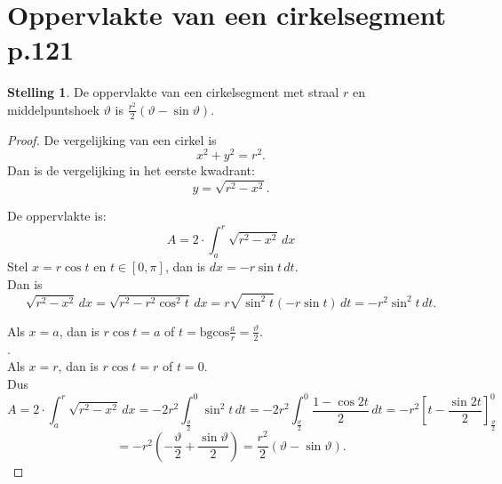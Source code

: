 \documentclass{article}
\theoremstyle{definition}
\newtheorem*{Stelling}{Stelling}
\begin{document}
\section{Oppervlakte van een cirkelsegment p.121}
\begin{Stelling}
De oppervlakte van een cirkelsegment met straal $r$ en middelpuntshoek $\vartheta$ is $\frac{r^2}{2}\left(\vartheta-\sin\vartheta\right).$
\end{Stelling}
\begin{proof}
De vergelijking van een cirkel is $$x^2+y^2=r^2.$$
Dan is de vergelijking in het eerste kwadrant:
$$y=\sqrt{r^2-x^2}.$$
De oppervlakte is: $$A = 2\cdot \int_a^r \sqrt{r^2-x^2}\,dx$$
Stel $x=r\cos t$ en $t\in\left[0,\pi\right]$, dan is $dx =-r\sin t\, dt$. \\
Dan is $$\sqrt{r^2-x^2}\,dx = \sqrt{r^2-r^2\cos^2t}\, dx=r\sqrt{\sin^2t}\left(-r\sin t\right)\,dt = -r^2\sin^2t\,dt.$$

Als $x=a$, dan is $r\cos t = a$ of $t=\text{bgcos}\frac{a}{r} = \frac{\vartheta}{2}$.\\.\\
Als $x=r$, dan is $r\cos t = r$ of $t=0$.\\
Dus $$A = 2\cdot\int_a^r \sqrt{r^2-x^2}\, dx =-2r^2\int_\frac{\vartheta}{2}^0\sin^2t\,dt = -2r^2\int_\frac{\vartheta}{2}^0 \frac{1-\cos2t}{2}\,dt = -r^2\left[t - \frac{\sin2t}{2}\right]_\frac{\vartheta}{2}^0$$ $$=-r^2\left(-\frac{\vartheta}{2}+\frac{\sin\vartheta}{2}\right) = \frac{r^2}{2}\left(\vartheta-\sin\vartheta\right).$$
\end{proof}
\end{document}
